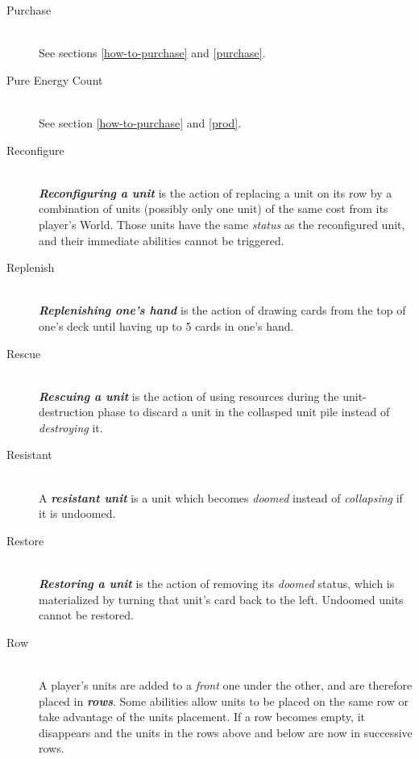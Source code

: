 \documentclass[a4paper]{article}
\begin{document}
\begin{description}
        \item[Purchase] \hfill \\
            See sections \ref{how-to-purchase} and \ref{purchase}.
            
        \item[Pure Energy Count] \hfill \\
            See section \ref{how-to-purchase} and \ref{prod}.
            
        \item[Reconfigure] \hfill \\
            \textbf{\textit{Reconfiguring a unit}} is the action of replacing a unit
            on its row by a combination of units (possibly only one unit)
            of the same cost from its player's World.
            Those units have the same \textit{status} as the reconfigured unit,
            and their immediate abilities cannot be triggered.
            
        \item[Replenish] \hfill \\
            \textbf{\textit{Replenishing one's hand}} is the action of drawing
            cards from the top of one's deck until having up to 5 cards in one's hand.
            
        \item[Rescue] \hfill \\
            \textbf{\textit{Rescuing a unit}} is the action of using resources
            during the unit-destruction phase to discard a unit in the collasped unit
            pile instead of \textit{destroying} it.
            
        \item[Resistant] \hfill \\
            A \textbf{\textit{resistant unit}} is a unit which becomes \textit{doomed}
            instead of \textit{collapsing} if it is undoomed.
            
        \item[Restore] \hfill \\
            \textbf{\textit{Restoring a unit}} is the action of removing
            its \textit{doomed} status, which is materialized by turning
            that unit's card back to the left.
            Undoomed units cannot be restored.
            
        \item[Row] \hfill \\
            A player's units are added to a \textit{front} one under the other,
            and are therefore placed in \textbf{\textit{rows}}.
            Some abilities allow units to be placed on the same row or
            take advantage of the units placement.
            If a row becomes empty, it disappears and the units in the rows
            above and below are now in successive rows.
            

\end{description}
\end{document}

